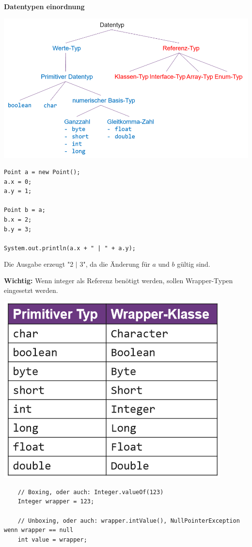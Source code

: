 \noindent\textbf{Datentypen einordnung}\\
\begin{center}
	\includegraphics[width=0.7\columnwidth]{Images/datentypen_einordnung}
\end{center}
\begin{lstlisting}
Point a = new Point();
a.x = 0;
a.y = 1;

Point b = a;
b.x = 2;
b.y = 3;

System.out.println(a.x + " | " + a.y);
\end{lstlisting}
Die Ausgabe erzeugt "2 $|$ 3", da die Änderung für $a$ und $b$ gültig sind.


\noindent\textbf{Wichtig:} Wenn integer als Referenz benötigt werden, sollen Wrapper-Typen eingesetzt werden.
\begin{center}
	\includegraphics[width=0.4\columnwidth]{Images/wrapper}
\end{center}
\begin{lstlisting}
	// Boxing, oder auch: Integer.valueOf(123)
	Integer wrapper = 123;
	
	// Unboxing, oder auch: wrapper.intValue(), NullPointerException wenn wrapper == null
	int value = wrapper;
\end{lstlisting}
